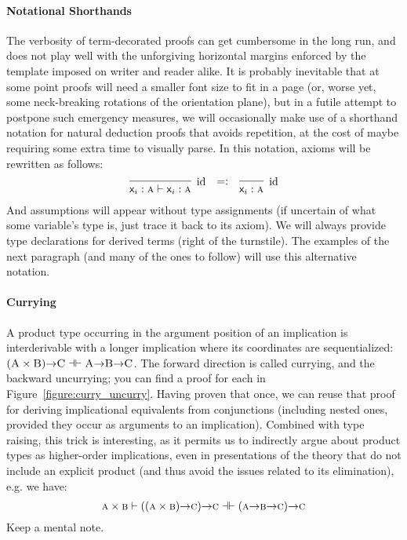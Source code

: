\paragraph{Notational Shorthands}
The verbosity of term-decorated proofs can get cumbersome in the long run, and does not play well with the unforgiving horizontal margins enforced by the template imposed on writer and reader alike.
It is probably inevitable that at some point proofs will need a smaller font size to fit in a page (or, worse yet, some neck-breaking rotations of the orientation plane), but in a futile attempt to postpone such emergency measures, we will occasionally make use of a shorthand notation for natural deduction proofs that avoids repetition, at the cost of maybe requiring some extra time to visually parse.
In this notation, axioms will be rewritten as follows:
\[
\infer[\Ax]{\term{\vari }: \prop{a} \vdash \term{\vari }: \prop{a}}{} \quad \raisebox{7pt}{$=:$} \quad \infer[\Ax]{\term{\vari }:\prop{a}}{}
\]
And assumptions will appear without type assignments (if uncertain of what some variable's type is, just trace it back to its axiom). 
We will always provide type declarations for derived terms (right of the turnstile).
The examples of the next paragraph (and many of the ones to follow) will use this alternative notation.

\paragraph{Currying}
A product type occurring in the argument position of an implication is interderivable with a longer implication where its coordinates are sequentialized: $(\smallprop{A}\times\smallprop{B}) \ii \smallprop{C} \dashv \vdash \smallprop{A} \ii \smallprop{B} \ii \smallprop{C}$.
The forward direction is called currying, and the backward uncurrying; you can find a proof for each in Figure~\ref{figure:curry_uncurry}.
Having proven that once, we can reuse that proof for deriving implicational equivalents from conjunctions (including nested ones, provided they occur as arguments to an implication).
Combined with type raising, this trick is interesting, as it permits us to indirectly argue about product types as higher-order implications, even in presentations of the theory that do not include an explicit product (and thus avoid the issues related to its elimination), e.g. we have:
\begin{equation}
	\prop{a} \times \prop{b} \vdash ((\prop{a} \times \prop{b}) \ii \prop{c}) \ii \prop{c} \dashv \vdash (\prop{a} \ii \prop{b} \ii \prop{c}) \ii \prop{c}
\end{equation}
Keep a mental note.

